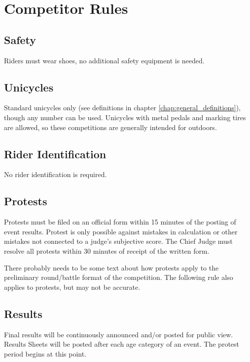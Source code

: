 \chapter{Competitor Rules}

\section{Safety}

Riders must wear shoes, no additional safety equipment is needed.

\section{Unicycles}

Standard unicycles only (see definitions in chapter \ref{chap:general_definitions}), though any number can be used.
Unicycles with metal pedals and marking tires are allowed, so these competitions are generally intended for outdoors.

\section{Rider Identification}

No rider identification is required.

\section{Protests}

Protests must be filed on an official form within 15 minutes of the posting of event results.
Protest is only possible against mistakes in calculation or other mistakes not connected to a judge's subjective score.
The Chief Judge must resolve all protests within 30 minutes of receipt of the written form.

\begin{comment2016}
There probably needs to be some text about how protests apply to the preliminary round/battle format of the competition.  The following rule also applies to protests, but may not be accurate.
\end{comment2016}

\section{Results}
Final results will be continuously announced and/or posted for public view.
Results Sheets will be posted after each age category of an event.
The protest period begins at this point.


